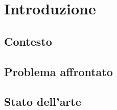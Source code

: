 \chapter{Introduzione} 
\label{chap:introduzione}

\acresetall

%
%

\section{Contesto}


\section{Problema affrontato}


\section{Stato dell'arte}

